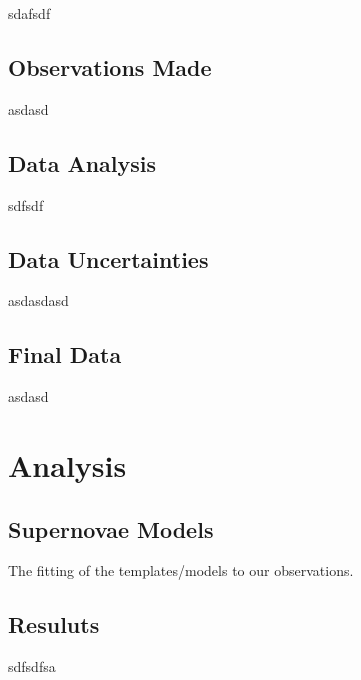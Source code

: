 \documentclass[twocolumn]{revtex4}
\begin{document}
sdafsdf

\vspace{-3ex}
\subsection{Observations Made}
\vspace{-2ex}

asdasd

\vspace{-3ex}
\subsection{Data Analysis}
\vspace{-2ex}

sdfsdf

\vspace{-3ex}
\subsection{Data Uncertainties}
\vspace{-2ex}

asdasdasd

\vspace{-3ex}
\subsection{Final Data}
\vspace{-2ex}

asdasd

\vspace{-3ex}
\section{Analysis}
\vspace{-2ex}
\subsection{Supernovae Models}
\vspace{-2ex}

The fitting of the templates/models to our observations.

\vspace{-3ex}
\subsection{Resuluts}
\vspace{-2ex}

sdfsdfsa
\end{document}
